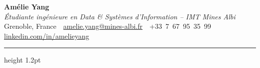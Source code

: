 \documentclass[10.5pt,a4paper]{article}
\begin{document}
\begin{center}
  {\fontsize{26}{30}\selectfont\bfseries Amélie Yang}\\[4pt]
  {\color{accent}\itshape\large Étudiante ingénieure en Data \& Systèmes d'Information -- IMT Mines Albi}\\[6pt]
  {\small
    Grenoble, France
    \,\textbullet\,
    \href{mailto:amelie.yang@mines-albi.fr}{amelie.yang@mines-albi.fr}
    \,\textbullet\,
    +33~7~67~95~35~99
    \,\textbullet\,
    \href{https://www.linkedin.com/in/amelieyang}{linkedin.com/in/amelieyang}
  }
\end{center}

\vspace{3pt}
{\color{accent}\hrule height 1.2pt}
\vspace{4pt}
\end{document}
